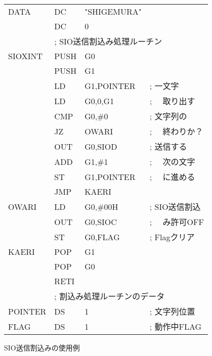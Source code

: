 \begin{figure}[btp]
{\begin{center}
\begin{tabular}{|l|l l l|}
DATA    & DC    & "SHIGEMURA"        &                   \\
        & DC    & 0                  &                   \\
        & \multicolumn{3}{|l|}{; SIO送信割込み処理ルーチン}\\
SIOXINT & PUSH  & G0                 &                   \\
        & PUSH  & G1                 &                   \\
        & LD    & G1,POINTER         & ; 一文字          \\
        & LD    & G0,0,G1            & ; 　取り出す      \\
        & CMP   & G0,\#0             & ; 文字列の        \\
        & JZ    & OWARI              & ; 　終わりか？    \\
        & OUT   & G0,SIOD            & ; 送信する        \\
        & ADD   & G1,\#1             & ; 　次の文字      \\
        & ST    & G1,POINTER         & ; 　に進める      \\
        & JMP   & KAERI              &                   \\
OWARI   & LD    & G0,\#00H           & ; SIO送信割込     \\
        & OUT   & G0,SIOC            & ; 　み許可OFF     \\
        & ST    & G0,FLAG            & ; Flagクリア      \\
KAERI   & POP   & G1                 &                   \\
        & POP   & G0                 &                   \\
        & RETI  &                    &                   \\
        & \multicolumn{3}{|l|}{; 割込み処理ルーチンのデータ} \\
POINTER & DS    & 1                  & ; 文字列位置      \\
FLAG    & DS    & 1                  & ; 動作中FLAG    \\
\hline
\end{tabular}
\end{center}}
\caption{SIO送信割込みの使用例}
\label{fig:chap6:sioout}
\end{figure}

